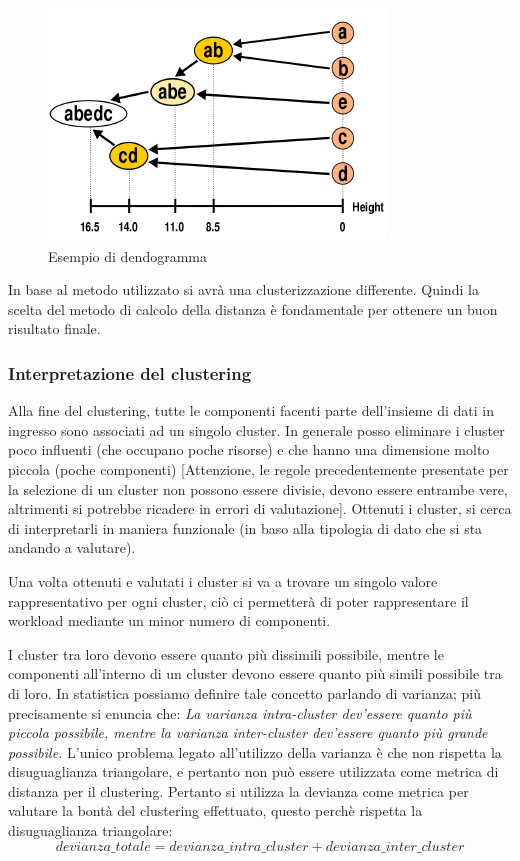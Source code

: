 \begin{figure}[h]
\centering
\includegraphics[width=.8\textwidth]{img/dendogramma.png}
\caption{Esempio di dendogramma}\label{img:dendogramma}
\end{figure}

\begin{warn}
In base al metodo utilizzato si avrà una clusterizzazione differente. Quindi la scelta del metodo di calcolo della distanza è fondamentale per ottenere un buon risultato finale.
\end{warn}

\subsubsection{Interpretazione del clustering}
Alla fine del clustering, tutte le componenti facenti parte dell'insieme di dati in ingresso sono associati ad un singolo cluster. In generale posso eliminare i cluster poco influenti (che occupano poche risorse) e che hanno una dimensione molto piccola (poche componenti) [Attenzione, le regole precedentemente presentate per la selezione di un cluster non possono essere divisie, devono essere entrambe vere, altrimenti si potrebbe ricadere in errori di valutazione]. Ottenuti i cluster, si cerca di interpretarli in maniera funzionale (in baso alla tipologia di dato che si sta andando a valutare).

Una volta ottenuti e valutati i cluster si va a trovare un singolo valore rappresentativo per ogni cluster, ciò ci permetterà di poter rappresentare il workload mediante un minor numero di componenti.

I cluster tra loro devono essere quanto più dissimili possibile, mentre le componenti all'interno di un cluster devono essere quanto più simili possibile tra di loro. In statistica possiamo definire tale concetto parlando di varianza; più precisamente si enuncia che:
\textit{La varianza intra-cluster dev'essere quanto più piccola possibile, mentre la varianza inter-cluster dev'essere quanto più grande possibile.}
L'unico problema legato all'utilizzo della varianza è che non rispetta la disuguaglianza triangolare, e pertanto non può essere utilizzata come metrica di distanza per il clustering. Pertanto si utilizza la devianza come metrica per valutare la bontà del clustering effettuato, questo perchè rispetta la disuguaglianza triangolare:
\[
devianza\_totale = devianza\_intra\_cluster + devianza\_inter\_cluster
\label{for:triangolare}
\]

